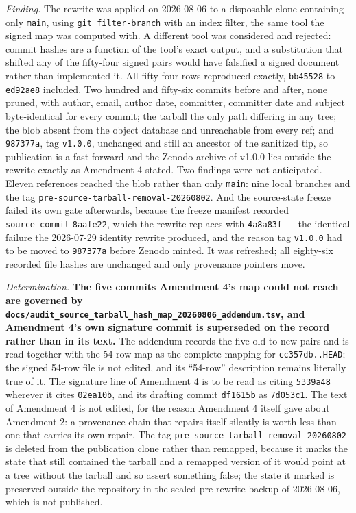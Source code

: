 \emph{Finding.} The rewrite was applied on 2026-08-06 to a disposable clone containing only \texttt{main}, using \texttt{git filter-\allowbreak{}branch} with an index filter, the same tool the signed map was computed with. A different tool was considered and rejected: commit hashes are a function of the tool's exact output, and a substitution that shifted any of the fifty-four signed pairs would have falsified a signed document rather than implemented it. All fifty-four rows reproduced exactly, \texttt{bb45528} to \texttt{ed92ae8} included. Two hundred and fifty-six commits before and after, none pruned, with author, email, author date, committer, committer date and subject byte-identical for every commit; the tarball the only path differing in any tree; the blob absent from the object database and unreachable from every ref; and \texttt{987377a}, tag \texttt{v1.0.0}, unchanged and still an ancestor of the sanitized tip, so publication is a fast-forward and the Zenodo archive of v1.0.0 lies outside the rewrite exactly as Amendment 4 stated. Two findings were not anticipated. Eleven references reached the blob rather than only \texttt{main}: nine local branches and the tag \texttt{pre-\allowbreak{}source-\allowbreak{}tarball-\allowbreak{}removal-\allowbreak{}20260802}. And the source-state freeze failed its own gate afterwards, because the freeze manifest recorded \texttt{source\_commit} \texttt{8aafe22}, which the rewrite replaces with \texttt{4a8a83f} --- the identical failure the 2026-07-29 identity rewrite produced, and the reason tag \texttt{v1.0.0} had to be moved to \texttt{987377a} before Zenodo minted. It was refreshed; all eighty-six recorded file hashes are unchanged and only provenance pointers move.

\emph{Determination.} \textbf{The five commits Amendment 4's map could not reach are governed by \texttt{docs/\allowbreak{}audit\_source\_tarball\_hash\_map\_20260806\_addendum.tsv}, and Amendment 4's own signature commit is superseded on the record rather than in its text.} The addendum records the five old-to-new pairs and is read together with the 54-row map as the complete mapping for \texttt{cc357db..HEAD}; the signed 54-row file is not edited, and its ``54-row'' description remains literally true of it. The signature line of Amendment 4 is to be read as citing \texttt{5339a48} wherever it cites \texttt{02ea10b}, and its drafting commit \texttt{df1615b} as \texttt{7d053c1}. The text of Amendment 4 is not edited, for the reason Amendment 4 itself gave about Amendment 2: a provenance chain that repairs itself silently is worth less than one that carries its own repair. The tag \texttt{pre-\allowbreak{}source-\allowbreak{}tarball-\allowbreak{}removal-\allowbreak{}20260802} is deleted from the publication clone rather than remapped, because it marks the state that still contained the tarball and a remapped version of it would point at a tree without the tarball and so assert something false; the state it marked is preserved outside the repository in the sealed pre-rewrite backup of 2026-08-06, which is not published.

